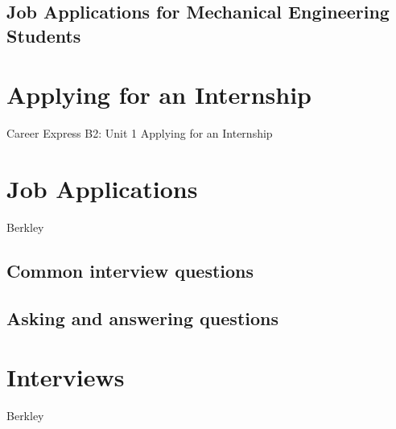 \section{Job Applications for Mechanical Engineering Students}



\chapter{Applying for an Internship}
Career Express B2: Unit 1 Applying for an Internship











\chapter{Job Applications}
Berkley%
\section{Common interview questions}
\section{Asking and answering questions}


\chapter{Interviews}
Berkley%

